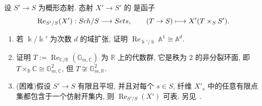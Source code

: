 \begin{exercise}[Weil 限制, 困难]\label{src:1.3.24}
设 $S'\to S$ 为概形态射. 态射 $X'\to S'$ 的 是函子
\[
\operatorname{Re}_{S'/S}(X'):Sch/S\longrightarrow Sets,\qquad
(T\to S)\longmapsto X'(T\times_S S').
\]
\begin{enumerate}[(1)]
\item 若 $\Bbbk/\Bbbk'$ 为次数 $d$ 的域扩张, 证明 $\operatorname{Re}_{\Bbbk'/\Bbbk}\mathbb A^1\cong\mathbb A^d$.
\item 证明 $T:=\operatorname{Re}_{\mathbb C/\mathbb R}(\mathbb G_{m,\mathbb C})$ 为 $\mathbb R$ 上的代数群, 它是秩为 $2$ 的非分裂环面, 即 $T\times_{\mathbb R}\mathbb C\cong\mathbb G_{m,\mathbb C}^2$, 但 $T\not\cong\mathbb G_{m,\mathbb R}^2$.
\item (困难)假设 $S'\to S$ 有限且平坦, 并且对每个 $s\in S$, 纤维 $X'_s$ 中的任意有限点集都包含于一个仿射开集内, 则 $\operatorname{Re}_{S'/S}(X')$ 可表. 另见~\cite[定理 $7.4$]{BLR90}.
\end{enumerate}
\end{exercise}

